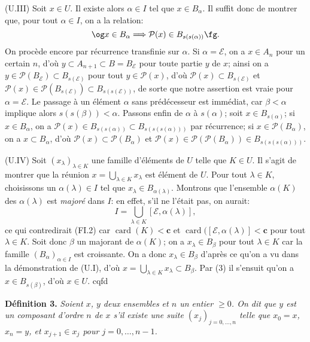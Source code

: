 \documentclass[12pt]{article}
\newcommand{\nn}{\noindent}
\newcommand{\card}{\operatorname{card}}
\begin{document}
(U.III) Soit $x\in U$. Il existe alors $\alpha\in I$ tel que $x\in B_{\alpha}$. Il suffit donc de montrer que, pour tout $\alpha\in I$, on a la relation:
$$
\text{\og}x\in B_{\alpha}\Longrightarrow \mathcal{P}(x)\in B_{s(s(\alpha))}\text{\fg}.
$$
On procède encore par récurrence transfinie sur $\alpha$. Si $\alpha=\mathcal{E}$, on a $x\in A_n$ pour un certain $n$, d'où $y\subset A_{n+1}\subset B=B_{\mathcal{E}}$ pour toute partie $y$ de $x$; ainsi on a $y\in \mathcal{P}(B_{\mathcal{E}})\subset B_{s(\mathcal{E})}$ pour tout $y\in \mathcal{P}(x)$, d'où $\mathcal{P}(x)\subset B_{s(\mathcal{E})}$ et $\mathcal{P}(x)\in\mathcal{P}(B_{s(\mathcal{E})})\subset B_{s(s(\mathcal{E}))}$, de sorte que notre assertion est vraie pour $\alpha= \mathcal{E}$. Le passage à un élément $\alpha$ sans prédécesseur est immédiat, car $\beta < \alpha$ implique alors $s(s(\beta)) < \alpha$. Passons enfin de $\alpha$ à $s(\alpha)$; soit $x\in B_{s(\alpha)}$; si $x\in B_{\alpha}$, on a $\mathcal{P}(x)\in B_{s(s(\alpha))}\subset B_{s(s(s(\alpha)))}$ par récurrence; si $x\in\mathcal{P}(B_{\alpha})$, on a $x\subset B_{\alpha}$, d'où $\mathcal{P}(x)\subset \mathcal{P}(B_{\alpha})$ et $\mathcal{P}(x)\in \mathcal{P}(\mathcal{P}(B_{\alpha}))\in B_{s(s(s(\alpha)))}$.

(U.IV) Soit $(x_{\lambda})_{\lambda\in K}$ une famille d'éléments de $U$ telle que $K\in U$. Il s'agit de montrer que la réunion $x=\bigcup_{\lambda\in K}x_{\lambda}$ est élément de $U$. Pour tout $\lambda\in K$, choisissons un $\alpha(\lambda)\in I$ tel que $x_{\lambda}\in B_{\alpha(\lambda)}$. Montrons que l'ensemble $\alpha(K)$ des $\alpha(\lambda)$ est \emph{majoré} dans $I$: en effet, s'il ne l'était pas, on aurait:
$$
I=\bigcup_{\lambda\in K}[\mathcal{E}, \alpha(\lambda)],
$$
ce qui contredirait (FI.2) car $\card(K) < \mathbf c$ et $\card([\mathcal{E},\alpha(\lambda)] < \mathbf c$ pour tout $\lambda\in K$. Soit donc $\beta$ un majorant de $\alpha(K)$; on a $x_{\lambda}\in B_{\beta}$ pour tout $\lambda\in K$ car la famille $(B_{\alpha})_{\alpha \in I}$ est croissante. On a donc $x_{\lambda}\in B_{\beta}$ d'après ce qu'on a vu dans la démonstration de (U.I), d'où $x=\bigcup_{\lambda\in K}x_{\lambda}\subset B_{\beta}$. Par (3) il s'ensuit qu'on a $x\in B_{s(\beta)}$, d'où $x\in U$. cqfd

\nn\textbf{Définition 3.} \emph{Soient $x$, $y$ deux ensembles et $n$ un entier $\geq0$. On dit que $y$ est un composant d'ordre $n$ de $x$ s'il existe une suite $(x_j)_{j=0,\ldots,n}$ telle que $x_0=x$, $x_n=y$, et $x_{j+1}\in x_j$ pour $j=0,\ldots,n-1$.}
\end{document}
